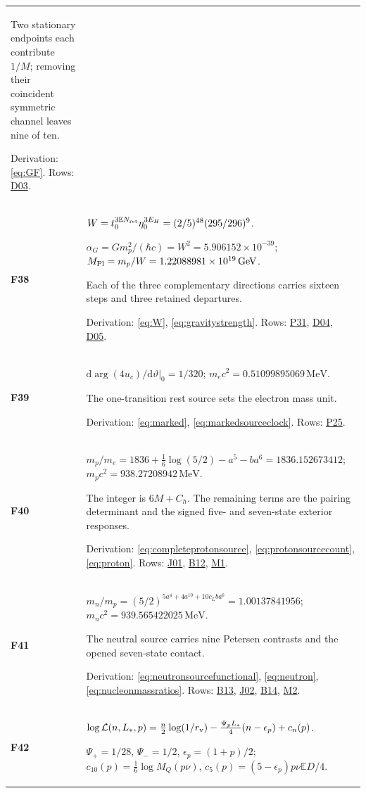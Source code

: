 \documentclass[aps,prx,onecolumn,10pt,notitlepage,nofootinbib,longbibliography]{revtex4-2}
\numberwithin{equation}{section}
\numberwithin{table}{section}
\newcommand{\EE}{\mathbb E}
\newcommand{\dd}{\mathrm d}
\newcommand{\MeV}{\,\mathrm{MeV}}
\newcommand{\GeV}{\,\mathrm{GeV}}
\begin{document}
\begin{longtable}{@{}>{\raggedright\arraybackslash}p{}>{\raggedright\arraybackslash}p{}@{}}
Two stationary endpoints each contribute $1/M$; removing their coincident symmetric channel leaves nine of ten.\par
Derivation: \eqref{eq:GF}. Rows: \hyperlink{row-D03}{D03}.\\[7pt]
\hypertarget{formula-F38}{}\textbf{F38}\label{formula:F38} & $W=t_0^{3\EE N_{\rm ret}}\eta_0^{3E_H}=(2/5)^{48}(295/296)^9$.\par $\alpha_G=Gm_p^2/(\hbar c)=W^2=5.906152\times10^{-39}$; $M_{\rm Pl}=m_p/W=1.22088981\times10^{19}\GeV$.\par
Each of the three complementary directions carries sixteen steps and three retained departures.\par
Derivation: \eqref{eq:W}, \eqref{eq:gravitystrength}. Rows: \hyperlink{row-P31}{P31}, \hyperlink{row-D04}{D04}, \hyperlink{row-D05}{D05}.\\[7pt]
\hypertarget{formula-F39}{}\textbf{F39}\label{formula:F39} & $\left.\dd\arg(4u_c)/\dd\vartheta\right|_0=1/320$; $m_e c^2=0.51099895069\MeV$.\par
The one-transition rest source sets the electron mass unit.\par
Derivation: \eqref{eq:marked}, \eqref{eq:markedsourceclock}. Rows: \hyperlink{row-P25}{P25}.\\[7pt]
\hypertarget{formula-F40}{}\textbf{F40}\label{formula:F40} & $m_p/m_e=1836+\frac16\log(5/2)-a^5-ba^6=1836.152673412$; $m_pc^2=938.27208942\MeV$.\par
The integer is $6M+C_h$. The remaining terms are the pairing determinant and the signed five- and seven-state exterior responses.\par
Derivation: \eqref{eq:completeprotonsource}, \eqref{eq:protonsourcecount}, \eqref{eq:proton}. Rows: \hyperlink{row-J01}{J01}, \hyperlink{row-B12}{B12}, \hyperlink{row-M1}{M1}.\\[7pt]
\hypertarget{formula-F41}{}\textbf{F41}\label{formula:F41} & $m_n/m_p=(5/2)^{5a^4+4a^{10}+10c_Lba^6}=1.00137841956$; $m_nc^2=939.565422025\MeV$.\par
The neutral source carries nine Petersen contrasts and the opened seven-state contact.\par
Derivation: \eqref{eq:neutronsourcefunctional}, \eqref{eq:neutron}, \eqref{eq:nucleonmassratios}. Rows: \hyperlink{row-B13}{B13}, \hyperlink{row-J02}{J02}, \hyperlink{row-B14}{B14}, \hyperlink{row-M2}{M2}.\\[7pt]
\hypertarget{formula-F42}{}\textbf{F42}\label{formula:F42} & $\log\mathcal L(n,L_*,p)=\frac n2\log(1/r_{\rm v})-\frac{\Psi_pL_*}{4}(n-\epsilon_p)+c_n(p)$.\par $\Psi_+=1/28$, $\Psi_-=1/2$, $\epsilon_p=(1+p)/2$; $c_{10}(p)=\frac16\log M_Q(p\nu)$, $c_5(p)=(5-\epsilon_p)p\nu\EE D/4$.\par

\end{longtable}
\end{document}
